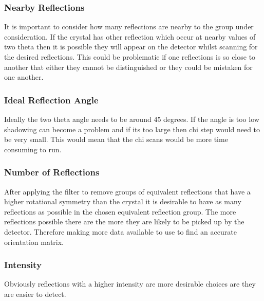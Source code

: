 \documentclass[10pt,a4paper]{article}
\begin{document}
\begin{multicols}{2}
\subsubsection*{Nearby Reflections}
It is important to consider how many reflections are nearby to the group under consideration. If the crystal has other reflection which occur at nearby
 values of two theta then it is possible they will appear on the detector whilst scanning for the desired reflections. This could be problematic if one
 reflections is so close to another that either they cannot be distinguished or they could be mistaken for one another.
\subsubsection*{Ideal Reflection Angle}
Ideally the two theta angle needs to be around 45 degrees. If the angle is too low shadowing can become a problem %
and if its too large then chi step would need to be very small. %
This would mean that the chi scans would be more time consuming to run.
\subsubsection*{Number of Reflections}
After applying the filter to remove groups of equivalent reflections that have a higher rotational symmetry than the crystal it is desirable to have as many 
reflections as possible in the chosen equivalent reflection group. The more reflections possible there are the more they are likely to  be picked up by the detector. Therefore making more data available to use to find an accurate orientation matrix.
\subsubsection*{Intensity}
Obviously reflections with a higher intensity are more desirable choices are they are easier to detect. 


\end{multicols}
\end{document}
